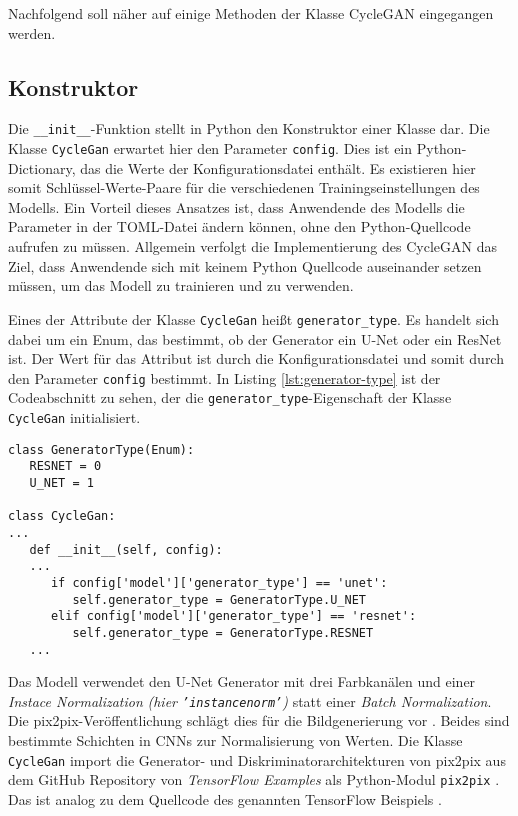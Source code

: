 Nachfolgend soll näher auf einige Methoden der Klasse \ac{CycleGAN} eingegangen werden.

\subsection{Konstruktor}

Die \texttt{__init__}-Funktion stellt in Python den Konstruktor einer Klasse dar. Die Klasse \texttt{CycleGan} erwartet hier den Parameter \texttt{config}. Dies ist ein Python-Dictionary, das die Werte der Konfigurationsdatei enthält. Es existieren hier somit Schlüssel-Werte-Paare für die verschiedenen Trainingseinstellungen des Modells. Ein Vorteil dieses Ansatzes ist, dass Anwendende des Modells die Parameter in der \ac{TOML}-Datei ändern können, ohne den Python-Quellcode aufrufen zu müssen. Allgemein verfolgt die Implementierung des \ac{CycleGAN} das Ziel, dass Anwendende sich mit keinem Python Quellcode auseinander setzen müssen, um das Modell zu trainieren und zu verwenden.

Eines der Attribute der Klasse \texttt{CycleGan} heißt \texttt{generator_type}. Es handelt sich dabei um ein Enum, das bestimmt, ob der Generator ein U-Net oder ein ResNet ist. Der Wert für das Attribut ist durch die Konfigurationsdatei und somit durch den Parameter \texttt{config} bestimmt. In Listing \ref{lst:generator-type} ist der Codeabschnitt zu sehen, der die \texttt{generator_type}-Eigenschaft der Klasse \texttt{CycleGan} initialisiert.

\begin{code}
	\begin{verbatim}
class GeneratorType(Enum):
   RESNET = 0
   U_NET = 1

class CycleGan:
...
   def __init__(self, config):
   ...
      if config['model']['generator_type'] == 'unet':
         self.generator_type = GeneratorType.U_NET
      elif config['model']['generator_type'] == 'resnet':
         self.generator_type = GeneratorType.RESNET
   ...
	\end{verbatim}
   \label{lst:generator-type}
\end{code}

Das Modell verwendet den U-Net Generator mit drei Farbkanälen und einer \emph{Instace Normalization} \emph{(hier \texttt{'instancenorm'})} statt einer \emph{Batch Normalization}. Die pix2pix-Veröffentlichung schlägt dies für die Bildgenerierung vor \cite{pix2pix}. Beides sind bestimmte Schichten in \acp{CNN} zur Normalisierung von Werten. Die Klasse \texttt{CycleGan} import die Generator- und Diskriminatorarchitekturen von pix2pix aus dem GitHub Repository von \emph{TensorFlow Examples} als Python-Modul \texttt{pix2pix} \cite{tensorflow-examples}. Das ist analog zu dem Quellcode des genannten TensorFlow Beispiels \cite{cyclegan-tutorial}.


